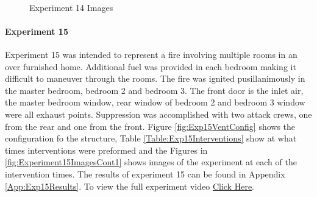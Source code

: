 \documentclass{article}
\begin{document}
\begin{figure}[H]
	\ContinuedFloat 
	\centering 
	 \ 
	\caption{Experiment 14 Images}
	\label{fig:Experiment14ImagesCont3} 
\end{figure}

\paragraph{Experiment 15}\mbox{}

Experiment 15 was intended to represent a fire involving multiple rooms in an over furnished home. Additional fuel was provided in each bedroom making it difficult to maneuver through the rooms. The fire was ignited pusillanimously in the master bedroom, bedroom 2 and bedroom 3. The front door is the inlet air, the master bedroom window, rear window of bedroom 2 and bedroom 3 window were all exhaust points. Suppression was accomplished with two attack crews, one from the rear and one from the front. Figure \ref{fig:Exp15VentConfig} shows the configuration fo the structure, Table \ref{Table:Exp15Interventions} show at what times interventions were preformed and the Figures in \ref{fig:Experiment15ImagesCont1} shows images of the experiment at each of the intervention times. The results of experiment 15 can be found in Appendix \ref{App:Exp15Results}. To view the full experiment video \href{https://youtu.be/yoZ9sIg_LEA}{Click Here}.
\end{document}
